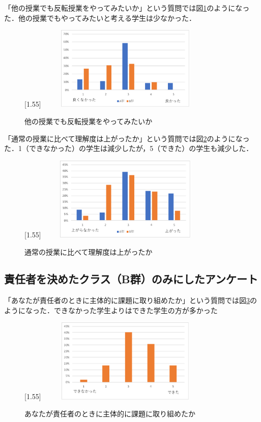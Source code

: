\documentclass[a4j,11pt]{jsarticle}
\begin{document}
「他の授業でも反転授業をやってみたいか」という質問では図\ref{anke12}のようになった．他の授業でもやってみたいと考える学生は少なかった．

\begin{figure}[h]
\begin{center}
\scalebox{1.2}[1.55]{
 \includegraphics[clip,width=85mm,height=40mm]{anke12.pdf}
 }
\end{center}
 \caption{他の授業でも反転授業をやってみたいか}
 \label{anke12}
\end{figure}

\newpage
「通常の授業に比べて理解度は上がったか」という質問では図\ref{anke13}のようになった．1（できなかった）の学生は減少したが，5（できた）の学生も減少した．

\begin{figure}[h]
\begin{center}
\scalebox{1.2}[1.55]{
 \includegraphics[clip,width=85mm,height=40mm]{anke13.pdf}
 }
\end{center}
 \caption{通常の授業に比べて理解度は上がったか}
 \label{anke13}
\end{figure}


\newpage
\subsection{責任者を決めたクラス（B群）のみにしたアンケート}

「あなたが責任者のときに主体的に課題に取り組めたか」という質問では図\ref{anke14}のようになった．できなかった学生よりはできた学生の方が多かった

\begin{figure}[h]
\begin{center}
\scalebox{1.2}[1.55]{
 \includegraphics[clip,width=85mm,height=40mm]{anke14.pdf}
 }
\end{center}
 \caption{あなたが責任者のときに主体的に課題に取り組めたか}
 \label{anke14}
\end{figure}
\end{document}
